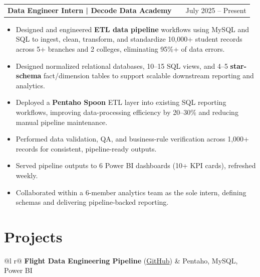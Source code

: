 \documentclass[a4paper,12pt]{article}
\makeatletter
\newenvironment{joblong}[2]
    {
    \begin{tabularx}{\linewidth}{@{}l X r@{}}
    \textbf{#1} & \hfill &  #2 \\[3.75pt]
    \end{tabularx}
    \begin{minipage}[t]{\linewidth}
    \begin{itemize}[nosep,after=\strut, leftmargin=1em, itemsep=3pt,label=--]
    }
    {
    \end{itemize}
    \end{minipage}
    }
\makeatother
\begin{document}
\begin{joblong}{Data Engineer Intern | Decode Data Academy}{July 2025 -- Present}
\item Designed and engineered \textbf{ETL data pipeline} workflows using MySQL and SQL to ingest, clean, transform, and standardize 10,000+ student records across 5+ branches and 2 colleges, eliminating 95\%+ of data errors.
\item Designed normalized relational databases, 10--15 SQL views, and 4--5 \textbf{star-schema} fact/dimension tables to support scalable downstream reporting and analytics.
\item Deployed a \textbf{Pentaho Spoon} ETL layer into existing SQL reporting workflows, improving data-processing efficiency by 20--30\% and reducing manual pipeline maintenance.
\item Performed data validation, QA, and business-rule verification across 1,000+ records for consistent, pipeline-ready outputs.
\item Served pipeline outputs to 6 Power BI dashboards (10+ KPI cards), refreshed weekly.
\item Collaborated within a 6-member analytics team as the sole intern, defining schemas and delivering pipeline-backed reporting.
\vspace{10pt}
\end{joblong}

\section{Projects}

\begin{tabularx}{\linewidth}{ @{}l r@{} }
\textbf{Flight Data Engineering Pipeline} \normalsize{(\href{https://github.com/Rider-04/flight-data-engineering-pipeline.git}{GitHub})} & \hfill \normalsize{Pentaho, MySQL, Power BI} \\[3.75pt]
 \\
\end{tabularx}
\end{document}
